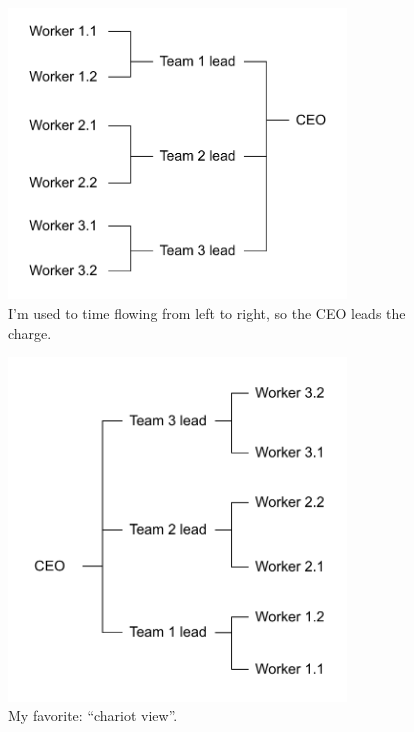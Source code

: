 \begin{figure}
\includegraphics[width=0.8\textwidth]{images/org-chart-orientation-ceo-leads.pdf}
\caption{I'm used to time flowing from left to right, so the CEO leads the charge.}
\label{org_chart_orientation_ceo-leads}
\end{figure}

\begin{figure}
\includegraphics[width=0.8\textwidth]{images/org-chart-orientation-workers-lead.pdf}
\caption{My favorite: ``chariot view''.}
\label{org_chart_orientation_ceo-follows}
\end{figure}

